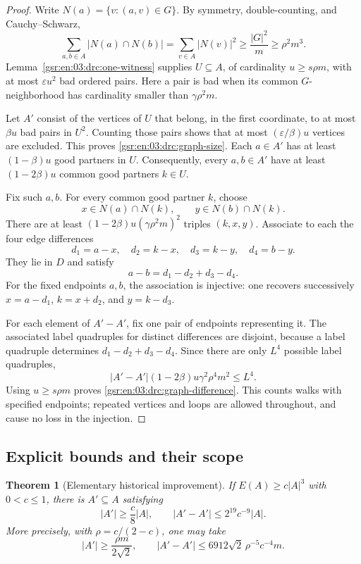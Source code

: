 \documentclass[11pt,letterpaper]{article}
\numberwithin{equation}{section}
\newtheorem{theorem}{Theorem}[section]
\theoremstyle{definition}
\theoremstyle{remark}
\newcommand{\1}{\mathbf 1}
\newcommand{\abs}[1]{\left|#1\right|}
\begin{document}
\begin{proof}
Write $N(a)=\{v:(a,v)\in G\}$.  By symmetry, double-counting, and
Cauchy--Schwarz,
\[
 \sum_{a,b\in A}\abs{N(a)\cap N(b)}
 =\sum_{v\in A}\abs{N(v)}^2
 \geq\frac{\abs G^2}{m}\geq\rho^2m^3.
\]
Lemma~\ref{gsr:en:03:drc:one-witness} supplies $U\subseteq A$, of cardinality
$u\geq s\rho m$, with at most $\varepsilon u^2$ bad ordered pairs.
Here a pair is bad when its common $G$-neighborhood has cardinality
smaller than $\gamma\rho^2m$.

Let $A'$ consist of the vertices of $U$ that belong, in the first
coordinate, to at most $\beta u$ bad pairs in $U^2$.  Counting those
pairs shows that at most $(\varepsilon/\beta)u$ vertices are excluded.
This proves \eqref{gsr:en:03:drc:graph-size}.  Each $a\in A'$ has at least
$(1-\beta)u$ good partners in $U$.  Consequently, every $a,b\in A'$ have
at least $(1-2\beta)u$ common good partners $k\in U$.

Fix such $a,b$.  For every common good partner $k$, choose
\[
 x\in N(a)\cap N(k),\qquad y\in N(b)\cap N(k).
\]
There are at least $(1-2\beta)u(\gamma\rho^2m)^2$ triples $(k,x,y)$.
Associate to each the four edge differences
\[
 d_1=a-x,\quad d_2=k-x,\quad d_3=k-y,\quad d_4=b-y.
\]
They lie in $D$ and satisfy
\[
 a-b=d_1-d_2+d_3-d_4.
\]
For the fixed endpoints $a,b$, the association is injective: one
recovers successively $x=a-d_1$, $k=x+d_2$, and $y=k-d_3$.

For each element of $A'-A'$, fix one pair of endpoints representing it.
The associated label quadruples for distinct differences are disjoint,
because a label quadruple determines $d_1-d_2+d_3-d_4$.  Since there are
only $L^4$ possible label quadruples,
\[
 \abs{A'-A'}(1-2\beta)u\gamma^2\rho^4m^2\leq L^4.
\]
Using $u\geq s\rho m$ proves \eqref{gsr:en:03:drc:graph-difference}.  This counts
walks with specified endpoints; repeated vertices and loops are allowed
throughout, and cause no loss in the injection.
\end{proof}

\subsection{Explicit bounds and their scope}

\begin{theorem}[Elementary historical improvement]\label{gsr:en:03:drc:elementary-bsg}
If $E(A)\geq c\abs A^3$ with $0<c\leq1$, there is $A'\subseteq A$
satisfying
\begin{equation}\label{gsr:en:03:drc:bsg-simple}
 \abs{A'}\geq\frac{c}{8}\abs A,
 \qquad
 \abs{A'-A'}\leq2^{19}c^{-9}\abs A.
\end{equation}
More precisely, with $\rho=c/(2-c)$, one may take
\begin{equation}\label{gsr:en:03:drc:bsg-precise}
 \abs{A'}\geq\frac{\rho m}{2\sqrt2},
 \qquad
 \abs{A'-A'}\leq6912\sqrt2\,\rho^{-5}c^{-4}m.
\end{equation}
\end{theorem}
\end{document}
